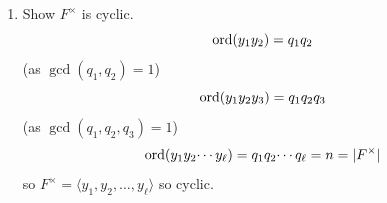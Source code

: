 \documentclass[10pt, a4paper]{article}
\begin{document}
\begin{problem}
\begin{solution}
\begin{enumerate}[label = (\alph*)]
            Remark:
            if $y ^ {p ^ i} = 1$ then
            \[
            y ^ {p ^ {i + 1}} = y ^ {p ^ i \cdot p} = (y ^ {p ^ i}) ^ p = 1.
            \]
            So,
            it is sufficient to show that the number of elements $\{y \mid y ^ {p ^ {n - 1}} = 1\} < q$.
            
            $|F ^ {\times}| = n$,
            $n = p_1 ^ {\ell_1} \dotsi p_k ^ {\ell_k} = q_1\dotsi q_k$.
            For any $q_i$ there exists $y_i \in F ^ {\times}$ such that $\ord(y_i) = q_i$.

            \item Show $F ^ {\times}$ is cyclic.
            \[
            \operatorname{ord}(y_1y_2) = q_1q_2
            \]
            (as $\gcd(q_1, q_2) = 1$)
            \[
            \operatorname{ord}(y_1y_2y_3) = q_1q_2q_3
            \]
            (as $\gcd(q_1, q_2, q_3) = 1$)
            \[
            \operatorname{ord}(y_1y_2 \dotsi y_{\ell}) = q_1q_2\dotsi q_{\ell} = n = |F ^ {\times}|
            \]
            so $F ^ {\times} = \langle y_1, y_2, \dotsc, y_{\ell}\rangle$ so cyclic.
        \end{enumerate}
    \end{solution}
\end{problem}
\end{document}
